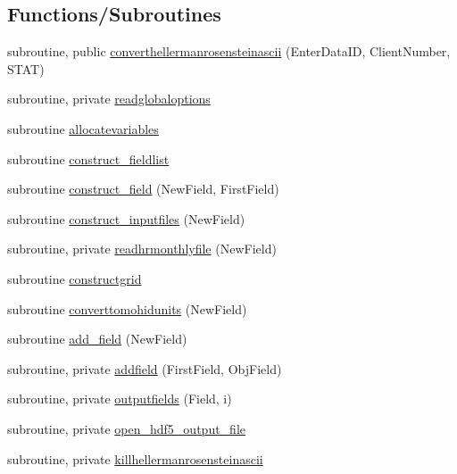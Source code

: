 \subsection*{Functions/\+Subroutines}
\begin{DoxyCompactItemize}
\item 
subroutine, public \mbox{\hyperlink{namespacemodulehellermanrosensteinascii_ae9a4ebb5ba70b59aa745588ca89b7a95}{converthellermanrosensteinascii}} (Enter\+Data\+ID, Client\+Number, S\+T\+AT)
\item 
subroutine, private \mbox{\hyperlink{namespacemodulehellermanrosensteinascii_af439206d121534b62861ec79a514b301}{readglobaloptions}}
\item 
subroutine \mbox{\hyperlink{namespacemodulehellermanrosensteinascii_ada851e8286a0ae4a7c890a405aefca9e}{allocatevariables}}
\item 
subroutine \mbox{\hyperlink{namespacemodulehellermanrosensteinascii_aabd09e7a0437013b82c90ca944358684}{construct\+\_\+fieldlist}}
\item 
subroutine \mbox{\hyperlink{namespacemodulehellermanrosensteinascii_af3153ec18443db4efe86a28f2c87ad90}{construct\+\_\+field}} (New\+Field, First\+Field)
\item 
subroutine \mbox{\hyperlink{namespacemodulehellermanrosensteinascii_a6ad7240d2c79e9b8cf9e5e96021b2650}{construct\+\_\+inputfiles}} (New\+Field)
\item 
subroutine, private \mbox{\hyperlink{namespacemodulehellermanrosensteinascii_a8a33a7b75c9d86b3447e0ab4f459e1c9}{readhrmonthlyfile}} (New\+Field)
\item 
subroutine \mbox{\hyperlink{namespacemodulehellermanrosensteinascii_aa865ee380c14fc3435be60b54b2d2513}{constructgrid}}
\item 
subroutine \mbox{\hyperlink{namespacemodulehellermanrosensteinascii_a8d26b87c5c59b45954adf68b0ada3545}{converttomohidunits}} (New\+Field)
\item 
subroutine \mbox{\hyperlink{namespacemodulehellermanrosensteinascii_a39c581f7647526ad3d09ea87b66e024a}{add\+\_\+field}} (New\+Field)
\item 
subroutine, private \mbox{\hyperlink{namespacemodulehellermanrosensteinascii_a0456421b402f98f76f0ff495f712916f}{addfield}} (First\+Field, Obj\+Field)
\item 
subroutine, private \mbox{\hyperlink{namespacemodulehellermanrosensteinascii_ab76e43d5b0134daf9106f606a088cbea}{outputfields}} (Field, i)
\item 
subroutine, private \mbox{\hyperlink{namespacemodulehellermanrosensteinascii_a7fa8f1b341c583ddb13cecd1d05b9e77}{open\+\_\+hdf5\+\_\+output\+\_\+file}}
\item 
subroutine, private \mbox{\hyperlink{namespacemodulehellermanrosensteinascii_a2350c23791f119cd18bfa9a4e532508c}{killhellermanrosensteinascii}}
\end{DoxyCompactItemize}
